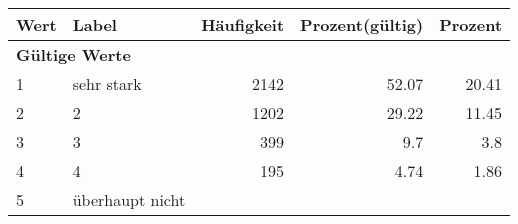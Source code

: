      \begin{longtable}{lXrrr}
     \toprule
     \textbf{Wert} & \textbf{Label} & \textbf{Häufigkeit} & \textbf{Prozent(gültig)} & \textbf{Prozent} \\
     \endhead
     \midrule
     \multicolumn{5}{l}{\textbf{Gültige Werte}}\\

     1 &
     \multicolumn{1}{X}{ sehr stark   } &


       \num{2142} &
       \num[round-mode=places,round-precision=2]{52,07} &
         \num[round-mode=places,round-precision=2]{20,41} \\

     2 &
     \multicolumn{1}{X}{ 2   } &


       \num{1202} &
       \num[round-mode=places,round-precision=2]{29,22} &
         \num[round-mode=places,round-precision=2]{11,45} \\

     3 &
     \multicolumn{1}{X}{ 3   } &


       \num{399} &
       \num[round-mode=places,round-precision=2]{9,7} &
         \num[round-mode=places,round-precision=2]{3,8} \\

     4 &
     \multicolumn{1}{X}{ 4   } &


       \num{195} &
       \num[round-mode=places,round-precision=2]{4,74} &
         \num[round-mode=places,round-precision=2]{1,86} \\

     5 &
     \multicolumn{1}{X}{ überhaupt nicht   } &



\end{longtable}
